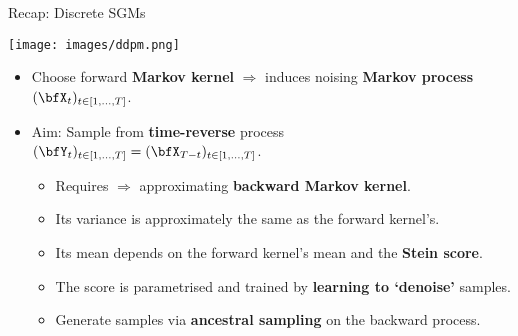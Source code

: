\begin{frame}{Recap: Discrete SGMs}
 \begin{center}
        \texttt{[image: images/ddpm.png]}
    \end{center}
\begin{itemize} [triangle]
    \item Choose forward \textbf{Markov kernel} $\Rightarrow$ induces noising \textbf{Markov process} $(\bfX_t)_{t\in[1,\dots,T]}$.
    \item Aim: Sample from \textbf{time-reverse} process  $(\bfY_t)_{t\in[1,\dots,T]} = (\bfX_{T-t})_{t\in[1,\dots,T]}$.
    \begin{itemize}  [circle]
    \item Requires $\Rightarrow$ approximating \textbf{backward Markov kernel}.
    \item Its variance is approximately the same as the forward kernel's.
    \item Its mean depends on the forward kernel's mean and the \textbf{Stein score}.
    \item The score is parametrised and trained by \textbf{learning to `denoise'} samples.
    \item Generate samples via \textbf{ancestral sampling} on the backward process.
    \end{itemize}
\end{itemize}
%
\end{frame}

